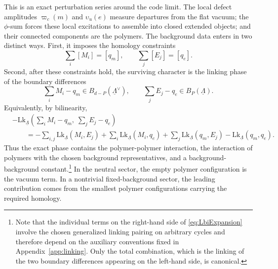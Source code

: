 \documentclass[dvipsnames,a4paper]{article}
\numberwithin{equation}{section}
\theoremstyle{definition}
\theoremstyle{remark}
\newcommand{\Lk}{\mathrm{Lk}}
\begin{document}
This is an exact perturbation series around the code limit. The local defect amplitudes
\(\varpi_c(m)\) and \(\upsilon_u(e)\) measure departures from the flat vacuum; the
\(\phi\)-sum forces these local excitations to assemble into closed extended objects; and
their connected components are the polymers. The background data enters in two distinct
ways. First, it imposes the homology constraints
\begin{equation}
\sum_i[M_i]=[q_m],
\qquad
\sum_j[E_j]=[q_e].
\end{equation}
Second, after these constraints hold, the surviving character is the linking phase of the
boundary differences
\begin{equation}
\sum_i M_i-q_m\in B_{d-P}(\underline\Lambda^\vee),
\qquad
\sum_j E_j-q_e\in B_P(\underline\Lambda).
\end{equation}
Equivalently, by bilinearity,
\begin{equation}
\begin{aligned}
	&-\Lk_{\underline\Lambda}
	\left(
	\sum_i M_i-q_m,\;
	\sum_j E_j-q_e
	\right)
	\\
	&\qquad
	=
	-\sum_{i,j} \Lk_{\underline\Lambda}
	\left(
	M_i,E_j
	\right)
	+
	\sum_i \Lk_{\underline\Lambda}
	\left(
	M_i,q_e
	\right)
	+
	\sum_j \Lk_{\underline\Lambda}
	\left(
	q_m,E_j
	\right)
	-
	\Lk_{\underline\Lambda}(q_m,q_e).
\end{aligned}
\label{eq:LbiExpansion}
\end{equation}
Thus the exact phase contains the polymer-polymer interaction, the interaction of polymers
with the chosen background representatives, and a background-background constant.\footnote{Note that the individual terms on the right-hand side of
	\eqref{eq:LbiExpansion} involve the chosen generalized linking pairing on
	arbitrary cycles and therefore depend on the auxiliary conventions fixed in
	Appendix~\ref{app:linking}. Only the total combination, which is the linking of
	the two boundary differences appearing on the left-hand side, is canonical.} In the
neutral sector, the empty polymer configuration is the vacuum term. In a nontrivial
fixed-background sector, the leading contribution comes from the smallest polymer
configurations carrying the required homology.
\end{document}
